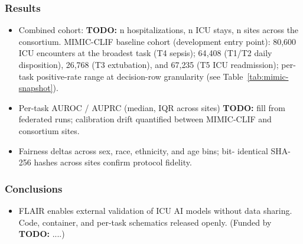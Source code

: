 \documentclass[11pt]{article}
\newcommand{\todo}[1]{{\color{red}\textbf{TODO:} #1}}
\begin{document}
\subsubsection*{Results}
\begin{itemize}[leftmargin=1.5em]
  \item Combined cohort: \todo{n hospitalizations, n ICU stays, n sites
        across the consortium}. MIMIC-CLIF baseline cohort (development
        entry point): 80{,}600 ICU encounters at the broadest task
        (T4 sepsis); 64{,}408 (T1/T2 daily disposition), 26{,}768
        (T3 extubation), and 67{,}235 (T5 ICU readmission);
        per-task positive-rate range at decision-row granularity
        (see Table~\ref{tab:mimic-snapshot}).
  \item Per-task AUROC / AUPRC (median, IQR across sites) \todo{fill from
        federated runs}; calibration drift quantified between MIMIC-CLIF
        and consortium sites.
  \item Fairness deltas across sex, race, ethnicity, and age bins; bit-
        identical SHA-256 hashes across sites confirm protocol fidelity.
\end{itemize}

\subsubsection*{Conclusions}
\begin{itemize}[leftmargin=1.5em]
  \item FLAIR enables external validation of ICU AI models without data
        sharing. Code, container, and per-task schematics released openly.
        (Funded by \todo{...}.)
\end{itemize}

\end{document}
